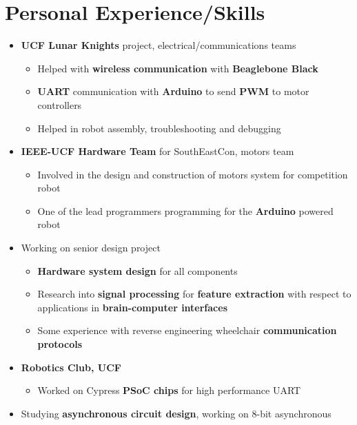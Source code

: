 \documentclass{my_resume}
\begin{document}
\section{Personal Experience/Skills}
\begin{itemize}
    \item \textbf{UCF Lunar Knights} project, electrical/communications teams
        \begin{itemize}
            \item Helped with \textbf{wireless communication} with
                \textbf{Beaglebone Black}
            \item \textbf{UART} communication with \textbf{Arduino} to send
                \textbf{PWM} to motor controllers
            \item Helped in robot assembly, troubleshooting and debugging
        \end{itemize}
    \item \textbf{IEEE-UCF Hardware Team} for SouthEastCon, motors team
        \begin{itemize}
            \item Involved in the design and construction of motors system for
                competition robot
            \item One of the lead programmers programming for the \textbf{Arduino}
                powered robot
        \end{itemize}
    \item Working on senior design project
        \begin{itemize}
            \item \textbf{Hardware system design} for all components
            \item Research into \textbf{signal processing} for \textbf{feature extraction}
                with respect to applications in \textbf{brain-computer interfaces}
            \item Some experience with reverse engineering wheelchair 
                \textbf{communication protocols}
        \end{itemize}
    \item \textbf{Robotics Club, UCF}
        \begin{itemize}
            \item Worked on Cypress \textbf{PSoC chips} for high performance UART
        \end{itemize}
    \item Studying \textbf{asynchronous circuit design}, working on 8-bit asynchronous

\end{itemize}
\end{document}
